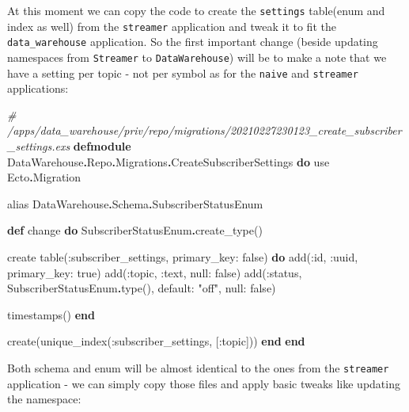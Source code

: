 \documentclass[
  oneside]{book}
\newenvironment{Shaded}{\begin{snugshade}}{\end{snugshade}}
\newcommand{\CommentTok}[1]{\textcolor[rgb]{0.56,0.35,0.01}{\textit{#1}}}
\newcommand{\ConstantTok}[1]{\textcolor[rgb]{0.00,0.00,0.00}{#1}}
\newcommand{\ImportTok}[1]{#1}
\newcommand{\KeywordTok}[1]{\textcolor[rgb]{0.13,0.29,0.53}{\textbf{#1}}}
\newcommand{\NormalTok}[1]{#1}
\newcommand{\OperatorTok}[1]{\textcolor[rgb]{0.81,0.36,0.00}{\textbf{#1}}}
\newcommand{\StringTok}[1]{\textcolor[rgb]{0.31,0.60,0.02}{#1}}
\newcommand{\VariableTok}[1]{\textcolor[rgb]{0.00,0.00,0.00}{#1}}
\begin{document}
At this moment we can copy the code to create the \texttt{settings} table(enum and index as well) from the \texttt{streamer} application and tweak it to fit the \texttt{data\_warehouse} application. So the first important change (beside updating namespaces from \texttt{Streamer} to \texttt{DataWarehouse}) will be to make a note that we have a setting per topic - not per symbol as for the \texttt{naive} and \texttt{streamer} applications:

\begin{Shaded}
\begin{Highlighting}[]
\CommentTok{\# /apps/data\_warehouse/priv/repo/migrations/20210227230123\_create\_subscriber\_settings.exs}
\KeywordTok{defmodule} \ConstantTok{DataWarehouse}\OperatorTok{.}\ConstantTok{Repo}\OperatorTok{.}\ConstantTok{Migrations}\OperatorTok{.}\ConstantTok{CreateSubscriberSettings} \KeywordTok{do}
  \ImportTok{use} \ConstantTok{Ecto}\OperatorTok{.}\ConstantTok{Migration}

  \ImportTok{alias} \ConstantTok{DataWarehouse}\OperatorTok{.}\ConstantTok{Schema}\OperatorTok{.}\ConstantTok{SubscriberStatusEnum}

  \KeywordTok{def}\NormalTok{ change }\KeywordTok{do}
    \ConstantTok{SubscriberStatusEnum}\OperatorTok{.}\NormalTok{create\_type()}

\NormalTok{    create table(}\VariableTok{:subscriber\_settings}\NormalTok{, }\VariableTok{primary\_key:} \ConstantTok{false}\NormalTok{) }\KeywordTok{do}
\NormalTok{      add(}\VariableTok{:id}\NormalTok{, }\VariableTok{:uuid}\NormalTok{, }\VariableTok{primary\_key:} \ConstantTok{true}\NormalTok{)}
\NormalTok{      add(}\VariableTok{:topic}\NormalTok{, }\VariableTok{:text}\NormalTok{, }\VariableTok{null:} \ConstantTok{false}\NormalTok{)}
\NormalTok{      add(}\VariableTok{:status}\NormalTok{, }\ConstantTok{SubscriberStatusEnum}\OperatorTok{.}\NormalTok{type(), }\VariableTok{default:} \StringTok{"off"}\NormalTok{, }\VariableTok{null:} \ConstantTok{false}\NormalTok{)}
      
\NormalTok{      timestamps()}
    \KeywordTok{end}

\NormalTok{    create(unique\_index(}\VariableTok{:subscriber\_settings}\NormalTok{, [}\VariableTok{:topic}\NormalTok{]))}
  \KeywordTok{end}
\KeywordTok{end}
\end{Highlighting}
\end{Shaded}

Both schema and enum will be almost identical to the ones from the \texttt{streamer} application - we can simply copy those files and apply basic tweaks like updating the namespace:
\end{document}
